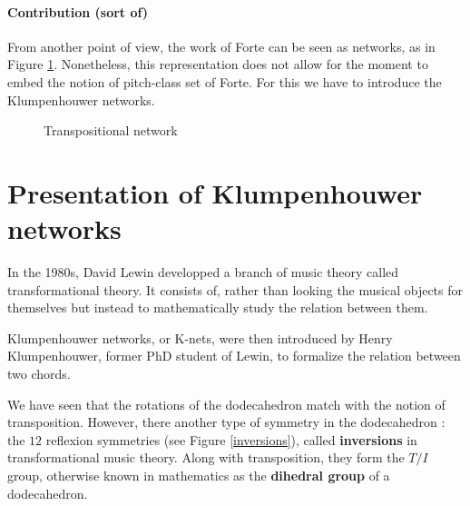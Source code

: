 \documentclass{report}
\begin{document}
\paragraph{Contribution (sort of)}
From another point of view, the work of Forte can be seen as networks, as in Figure \ref{transpose_net}. Nonetheless, this representation does not allow for the moment to embed the notion of pitch-class set of Forte. For this we have to introduce the Klumpenhouwer networks.
\begin{figure}[ht]
    \centering
    \caption{Transpositional network}
    \label{transpose_net}
\end{figure}

\section{Presentation of Klumpenhouwer networks}
In  the 1980s, David Lewin developped a branch of music theory called transformational theory\cite{rahn_lewin_1987}. It consists of, rather than looking the musical objects for themselves but instead to mathematically study the relation between them.

Klumpenhouwer networks, or K-nets, were then introduced by Henry Klumpenhouwer, former PhD student of Lewin, to formalize the relation between two chords\cite{lewin_1990}.

We have seen that the rotations of the dodecahedron match with the notion of transposition. However, there another type of symmetry in the dodecahedron : the $12$ reflexion symmetries (see Figure \ref{inversions}), called \textbf{inversions} in transformational music theory. Along with transposition, they form the $T/I$ group, otherwise known in mathematics as the \textbf{dihedral group} of a dodecahedron.

\setcounter{itemcount}{450}
\end{document}
